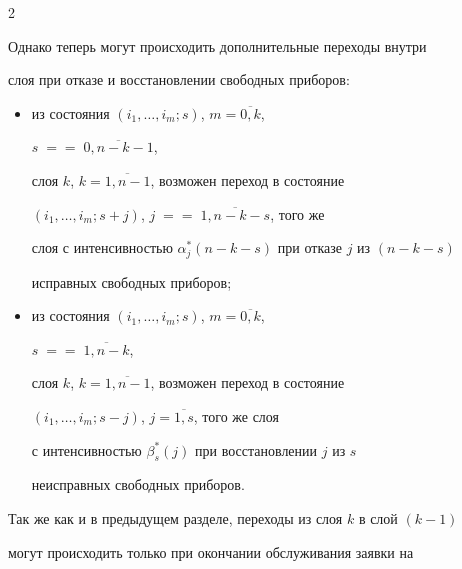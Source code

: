 \begin{multicols}{2}











Однако теперь могут происходить дополнительные переходы внутри


слоя при отказе и вос\-ста\-нов\-ле\-нии свободных приборов:


\begin{itemize}


\item из состояния $(i_1,\ldots,i_{m};s)$, $m=\overline{0,k}$,


$s\;=$\linebreak $=\;\overline{0,n-k-1}$,


слоя $k$, $k=\overline{1,n-1}$, возможен переход в состояние


$(i_1,\ldots,i_{m};s+j)$, $j\;=$\linebreak $=\;\overline{1,n-k-s}$, того же


слоя с интенсивностью $\alpha^*_j(n-k-s)$ при отказе $j$ из $(n-k-s)$


исправных свободных приборов;


\item


из состояния $(i_1,\ldots,i_{m};s)$, $m=\overline{0,k}$,


$s\;=$\linebreak $=\;\overline{1,n-k}$,


слоя $k$, $k=\overline{1,n-1}$, возможен переход в состояние


$(i_1,\ldots,i_{m};s-j)$, $j=\overline{1,s}$, того же слоя


с интенсивностью $\beta^*_s(j)$ при вос\-ста\-нов\-ле\-нии $j$ из $s$


неисправных свободных приборов.     %


\end{itemize}





Так же как и в предыдущем разделе, переходы из слоя $k$ в слой $(k-1)$


могут происходить только при окончании обслуживания заявки на



\end{multicols}
